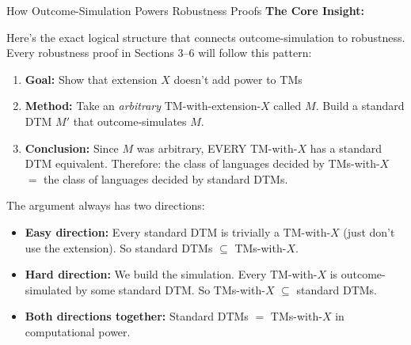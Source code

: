 \begin{conceptbox}{How Outcome-Simulation Powers Robustness Proofs}
\textbf{The Core Insight:}

Here's the exact logical structure that connects outcome-simulation to
robustness. Every robustness proof in Sections 3--6 will follow this pattern:

\begin{enumerate}[nosep]
\item \textbf{Goal:} Show that extension $X$ doesn't add power to TMs
\item \textbf{Method:} Take an \emph{arbitrary} TM-with-extension-$X$ called $M$.
  Build a standard DTM $M'$ that outcome-simulates $M$.
\item \textbf{Conclusion:} Since $M$ was arbitrary, EVERY TM-with-$X$ has a
  standard DTM equivalent. Therefore: the class of languages decided by
  TMs-with-$X$ $=$ the class of languages decided by standard DTMs.
\end{enumerate}

The argument always has two directions:
\begin{itemize}[nosep]
\item \textbf{Easy direction:} Every standard DTM is trivially a TM-with-$X$
  (just don't use the extension). So standard DTMs $\subseteq$ TMs-with-$X$.
\item \textbf{Hard direction:} We build the simulation. Every TM-with-$X$ is
  outcome-simulated by some standard DTM. So TMs-with-$X$ $\subseteq$ standard
  DTMs.
\item \textbf{Both directions together:} Standard DTMs $=$ TMs-with-$X$ in
  computational power.
\end{itemize}

\end{conceptbox}
